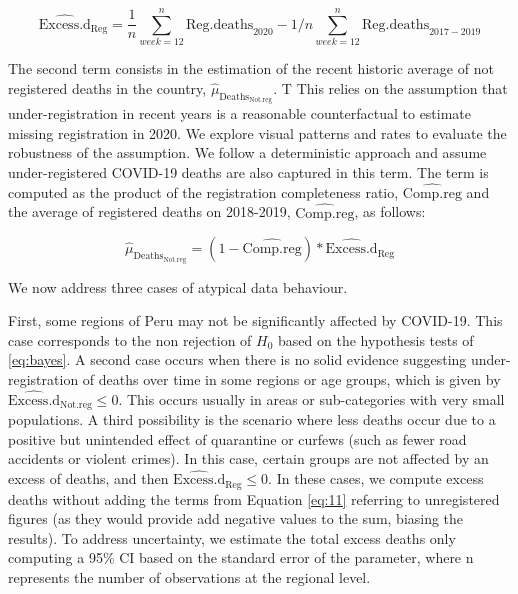 \documentclass[
]{article}
\begin{document}
\begin{equation}
  \label{eq:10}
  \widehat{\text{Excess.d}}_\text{Reg}= \frac{1}{n}{\sum_{week=12}^{n} \text{Reg.deaths}_{2020}}-1/n{\sum_{week=12}^{n} \text{Reg.deaths}_{2017-2019}}
\end{equation}

The second term consists in the estimation of the recent historic average of not registered deaths in the country, \(\widehat{\mu}_{\text{Deaths}_\text{Not.reg}}\). T This relies on the assumption that under-registration in recent years is a reasonable counterfactual to estimate missing registration in 2020. We explore visual patterns and rates to evaluate the robustness of the assumption. We follow a deterministic approach and assume under-registered COVID-19 deaths are also captured in this term. The term is computed as the product of the registration completeness ratio, \(\widehat{\text{Comp.reg}}\) and the average of registered deaths on 2018-2019, \(\widehat{\text{Comp.reg}}\), as follows:

\begin{equation}
  \label{eq:11}
  \widehat{\mu}_{\text{Deaths}_\text{Not.reg}}= (1-\widehat{\text{Comp.reg}})*\widehat{\text{Excess.d}}_\text{Reg}
\end{equation}

We now address three cases of atypical data behaviour.

First, some regions of Peru may not be significantly affected by COVID-19. This case corresponds to the non rejection of \(H_0\) based on the hypothesis tests of \eqref{eq:bayes}. A second case occurs when there is no solid evidence suggesting under-registration of deaths over time in some regions or age groups, which is given by \(\widehat{\text{Excess.d}}_\text{Not.reg} \le 0\). This occurs usually in areas or sub-categories with very small populations. A third possibility is the scenario where less deaths occur due to a positive but unintended effect of quarantine or curfews (such as fewer road accidents or violent crimes). In this case, certain groups are not affected by an excess of deaths, and then \(\widehat{\text{Excess.d}}_\text{Reg} \le 0\). In these cases, we compute excess deaths without adding the terms from Equation \eqref{eq:11} referring to unregistered figures (as they would provide add negative values to the sum, biasing the results). To address uncertainty, we estimate the total excess deaths only computing a 95\% CI based on the standard error of the parameter, where \(\text{n}\) represents the number of observations at the regional level.
\end{document}
